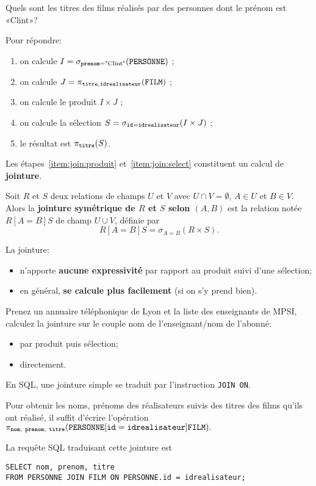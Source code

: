 Quels sont les titres des films réalisés par des personnes dont le prénom est
«Clint»?

Pour répondre:
\begin{enumerate}
\item on calcule $I=\sigma_{\mathtt{prenom}=\text{"Clint"}}(\mathtt{PERSONNE})$ ;
\item on calcule $J=\pi_{\mathtt{titre}, \mathtt{idrealisateur}}(\mathtt{FILM})$ ;
\item\label{item:join:produit}on calcule le produit $I\times J$ ;
\item\label{item:join:select}on calcule la sélection
  $S=\sigma_{\mathtt{id}=\mathtt{idrealisateur}}(I\times J)$ ;
\item le résultat est $\pi_{\mathtt{titre}}(S)$.
\end{enumerate}

Les étapes~\ref{item:join:produit} et~\ref{item:join:select}
constituent un calcul de \textbf{jointure}.
\begin{defi}[Jointure]
  Soit $R$ et $S$ deux relations de champs $U$ et $V$ avec
  $U\cap V = \emptyset$, $A\in U$ et $B\in V$.
  Alors
  la \textbf{jointure symétrique de $R$ et $S$ selon $(A,B)$} est la
  relation notée $R[A=B]S$ de
  champ $U\cup V$, définie par
  \begin{equation*}
    R[A=B] S = \sigma_{A=B}(R\times S).
  \end{equation*}
\end{defi}

La jointure:
\begin{itemize}
\item n'apporte \textbf{aucune expressivité} par rapport au produit suivi d'une  sélection;
\item en général, \textbf{se calcule plus facilement} (si on s'y prend   bien).
\end{itemize}

\begin{exemple}
  Prenez un annuaire téléphonique de Lyon et la liste des
enseignants de MPSI, calculez la jointure sur le couple nom de
l'enseignant/nom de l'abonné:
\begin{itemize}
\item par produit puis sélection;
\item directement.
\end{itemize}
\end{exemple}

En SQL, une jointure simple se traduit par l'instruction \texttt{JOIN ON}.
\begin{exemple}
Pour obtenir les noms, prénoms des réalisateurs suivis des titres des films qu'ils ont réalisé, il suffit d'écrire l'opération
$  \pi_{\mathtt{nom},\ \mathtt{prenom},\ \mathtt{titre}}(\mathtt{PERSONNE}[\mathtt{id} = \mathtt{idrealisateur}] \mathtt{FILM}).$

La requête SQL traduisant cette jointure est 
\begin{verbatim}
SELECT nom, prenom, titre
FROM PERSONNE JOIN FILM ON PERSONNE.id = idrealisateur;
\end{verbatim}

\end{exemple}

